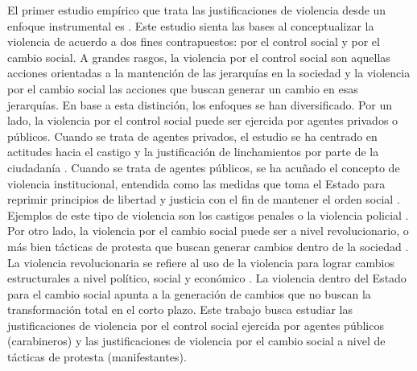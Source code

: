 \documentclass[12pt,twoside]{templates/facsothesis}
\begin{document}
El primer estudio empírico que trata las justificaciones de violencia desde un enfoque instrumental es \citet{Blumenthal1972}. Este estudio sienta las bases al conceptualizar la violencia de acuerdo a dos fines contrapuestos: por el control social y por el cambio social. A grandes rasgos, la violencia por el control social son aquellas acciones orientadas a la mantención de las jerarquías en la sociedad y la violencia por el cambio social las acciones que buscan generar un cambio en esas jerarquías. En base a esta distinción, los enfoques se han diversificado. Por un lado, la violencia por el control social puede ser ejercida por agentes privados o públicos. Cuando se trata de agentes privados, el estudio se ha centrado en actitudes hacia el castigo y la justificación de linchamientos por parte de la ciudadanía \citep[e.g.][]{Gerber2012, Gerber2016, Puga2016}. Cuando se trata de agentes públicos, se ha acuñado el concepto de violencia institucional, entendida como las medidas que toma el Estado para reprimir principios de libertad y justicia con el fin de mantener el orden social \citep{Nielsen1981}. Ejemplos de este tipo de violencia son los castigos penales o la violencia policial \citep{Puga2016}. Por otro lado, la violencia por el cambio social puede ser a nivel revolucionario, o más bien tácticas de protesta que buscan generar cambios dentro de la sociedad \citep{Nielsen1981}. La violencia revolucionaria se refiere al uso de la violencia para lograr cambios estructurales a nivel político, social y económico \citep[ver][]{Nielsen1977, Sune2010, Edyvane2020}. La violencia dentro del Estado para el cambio social apunta a la generación de cambios que no buscan la transformación total en el corto plazo. Este trabajo busca estudiar las justificaciones de violencia por el control social ejercida por agentes públicos (carabineros) y las justificaciones de violencia por el cambio social a nivel de tácticas de protesta (manifestantes).
\end{document}
